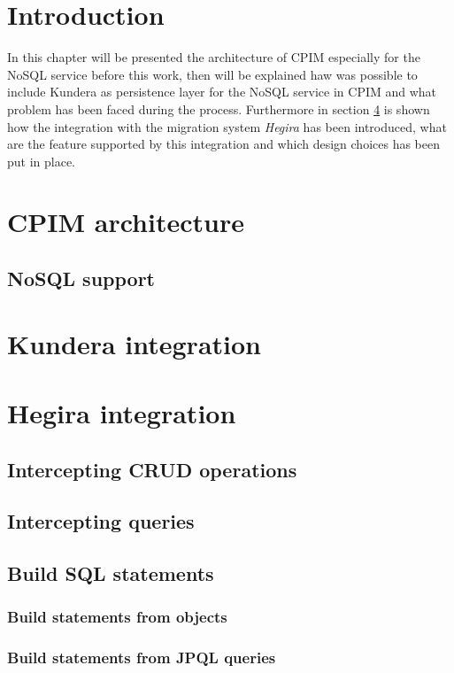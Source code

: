 \section{Introduction}
In this chapter will be presented the architecture of CPIM especially for the NoSQL service before this work, then will be explained haw was possible to include Kundera as persistence layer for the NoSQL service in CPIM and what problem has been faced during the process.
Furthermore in section \ref{sec:hegira} is shown how the integration with the migration system \textit{Hegira} has been introduced, what are the feature supported by this integration and which design choices has been put in place. 

\section{CPIM architecture}
\subsection{NoSQL support}

\section{Kundera integration}

\section{Hegira integration}
\label{sec:hegira}
\subsection{Intercepting CRUD operations}
\subsection{Intercepting queries}

\subsection{Build SQL statements}
\subsubsection{Build statements from objects}
\subsubsection{Build statements from JPQL queries}

